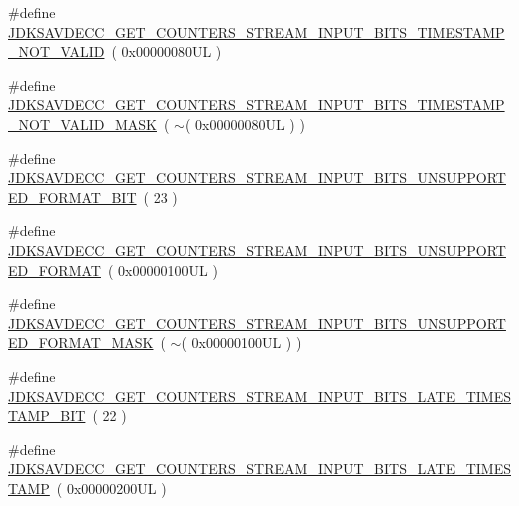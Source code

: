 \begin{DoxyCompactItemize}
\item 
\#define \hyperlink{group__get__counters__stream__input__bits_ga97dfb89bb0e7243635215ed0726dc1ef}{J\+D\+K\+S\+A\+V\+D\+E\+C\+C\+\_\+\+G\+E\+T\+\_\+\+C\+O\+U\+N\+T\+E\+R\+S\+\_\+\+S\+T\+R\+E\+A\+M\+\_\+\+I\+N\+P\+U\+T\+\_\+\+B\+I\+T\+S\+\_\+\+T\+I\+M\+E\+S\+T\+A\+M\+P\+\_\+\+N\+O\+T\+\_\+\+V\+A\+L\+ID}~( 0x00000080\+U\+L )
\item 
\#define \hyperlink{group__get__counters__stream__input__bits_gafa588ec3046b7078cda604d3b98f7916}{J\+D\+K\+S\+A\+V\+D\+E\+C\+C\+\_\+\+G\+E\+T\+\_\+\+C\+O\+U\+N\+T\+E\+R\+S\+\_\+\+S\+T\+R\+E\+A\+M\+\_\+\+I\+N\+P\+U\+T\+\_\+\+B\+I\+T\+S\+\_\+\+T\+I\+M\+E\+S\+T\+A\+M\+P\+\_\+\+N\+O\+T\+\_\+\+V\+A\+L\+I\+D\+\_\+\+M\+A\+SK}~( $\sim$( 0x00000080\+U\+L ) )
\item 
\#define \hyperlink{group__get__counters__stream__input__bits_gadab083ed9293fb89c493c444fbdab825}{J\+D\+K\+S\+A\+V\+D\+E\+C\+C\+\_\+\+G\+E\+T\+\_\+\+C\+O\+U\+N\+T\+E\+R\+S\+\_\+\+S\+T\+R\+E\+A\+M\+\_\+\+I\+N\+P\+U\+T\+\_\+\+B\+I\+T\+S\+\_\+\+U\+N\+S\+U\+P\+P\+O\+R\+T\+E\+D\+\_\+\+F\+O\+R\+M\+A\+T\+\_\+\+B\+IT}~( 23 )
\item 
\#define \hyperlink{group__get__counters__stream__input__bits_gaa639e0df55d30562710f28b10d48cb90}{J\+D\+K\+S\+A\+V\+D\+E\+C\+C\+\_\+\+G\+E\+T\+\_\+\+C\+O\+U\+N\+T\+E\+R\+S\+\_\+\+S\+T\+R\+E\+A\+M\+\_\+\+I\+N\+P\+U\+T\+\_\+\+B\+I\+T\+S\+\_\+\+U\+N\+S\+U\+P\+P\+O\+R\+T\+E\+D\+\_\+\+F\+O\+R\+M\+AT}~( 0x00000100\+U\+L )
\item 
\#define \hyperlink{group__get__counters__stream__input__bits_ga03dec0462d09254774da67a73e5f90fa}{J\+D\+K\+S\+A\+V\+D\+E\+C\+C\+\_\+\+G\+E\+T\+\_\+\+C\+O\+U\+N\+T\+E\+R\+S\+\_\+\+S\+T\+R\+E\+A\+M\+\_\+\+I\+N\+P\+U\+T\+\_\+\+B\+I\+T\+S\+\_\+\+U\+N\+S\+U\+P\+P\+O\+R\+T\+E\+D\+\_\+\+F\+O\+R\+M\+A\+T\+\_\+\+M\+A\+SK}~( $\sim$( 0x00000100\+U\+L ) )
\item 
\#define \hyperlink{group__get__counters__stream__input__bits_ga0f0b1c51ab1aa0afa66a05446e338308}{J\+D\+K\+S\+A\+V\+D\+E\+C\+C\+\_\+\+G\+E\+T\+\_\+\+C\+O\+U\+N\+T\+E\+R\+S\+\_\+\+S\+T\+R\+E\+A\+M\+\_\+\+I\+N\+P\+U\+T\+\_\+\+B\+I\+T\+S\+\_\+\+L\+A\+T\+E\+\_\+\+T\+I\+M\+E\+S\+T\+A\+M\+P\+\_\+\+B\+IT}~( 22 )
\item 
\#define \hyperlink{group__get__counters__stream__input__bits_ga55f179524ed7ed794d1031d7ebb0e0fa}{J\+D\+K\+S\+A\+V\+D\+E\+C\+C\+\_\+\+G\+E\+T\+\_\+\+C\+O\+U\+N\+T\+E\+R\+S\+\_\+\+S\+T\+R\+E\+A\+M\+\_\+\+I\+N\+P\+U\+T\+\_\+\+B\+I\+T\+S\+\_\+\+L\+A\+T\+E\+\_\+\+T\+I\+M\+E\+S\+T\+A\+MP}~( 0x00000200\+U\+L )

\end{DoxyCompactItemize}
